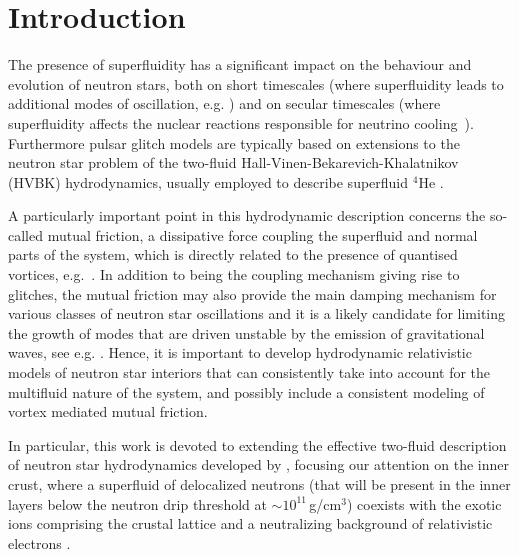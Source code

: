 \documentclass[preprints,article,accept,moreauthors,pdftex]{mdpi}
\begin{document}



\section{Introduction} 

The presence of superfluidity has a significant impact on the behaviour and evolution of neutron stars,
both on short timescales (where superfluidity leads to additional modes of oscillation, e.g. \cite{and_com_lang_2002,KhomenkoPhysRevD2019,chamel_modes_crust_2013}) and on secular timescales (where superfluidity affects the nuclear reactions responsible for  neutrino cooling~\cite{yako_cooling_rev}). 
%
Furthermore pulsar glitch models \citep{haskellmelatos2015} are typically based on extensions to the neutron star problem of the  two-fluid Hall-Vinen-Bekarevich-Khalatnikov (HVBK) hydrodynamics, usually employed to describe superfluid $^4$He \cite{donnelly_book,sonin_book_2016}.

A particularly important point in this hydrodynamic description concerns the so-called mutual friction, a dissipative force coupling the superfluid and normal parts of the system, which is directly related to the presence of quantised vortices, e.g.~\cite{langlois98,andersson_sidery_2006,GusakovHVBK,Andersson_Mutual_Friction_2016,Rau2020PhRvD,sourie_corepinn_2020MNRAS,antonelli2020MNRAS}. 
In addition to being the coupling mechanism giving rise to glitches, the mutual friction may also provide the main damping mechanism for various classes of neutron star oscillations and it is a likely candidate for limiting the growth of modes that are driven unstable by the emission of gravitational waves, see e.g. \cite{lind_mend_2000PhRvD,Haskell_rmodes_2009}.
Hence, it is important to develop hydrodynamic relativistic models of neutron star interiors that can consistently take into account for the multifluid nature of the system, and possibly include a consistent modeling of vortex mediated mutual friction. 

In particular, this work is devoted to extending the effective two-fluid description of neutron star hydrodynamics developed by \citet{langlois98}, focusing our attention on the inner crust, where a superfluid of delocalized neutrons (that will be present in the inner layers below the neutron drip threshold at $\sim 10^{11}\,$g/cm$^3$) coexists with the exotic ions comprising the crustal lattice and a neutralizing background of relativistic electrons \cite{chamel_review_crust}.
\end{document}
